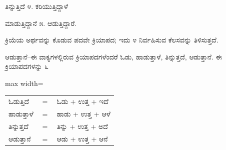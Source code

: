 \vspace{2.5pt plus 3pt minus 0.5pt}\noindent\hspace*{1.2em}\hspace{0.55em}ತಿನ್ನುತ್ತಿದೆ ೪. ಕರಿಯುತ್ತಿದ್ದಾಳೆ\par

\vspace{2.5pt plus 3pt minus 0.5pt}\noindent\hspace*{1.2em}\hspace{0.55em}ಮಾಡುತ್ತಿದ್ದಾನೆ ೫. ಆಡುತ್ತಿದ್ದಾರೆ.\par


\indent ಕ್ರಿಯೆಯ ಅರ್ಥವನ್ನು ಕೊಡುವ ಪದವೇ ಕ್ರಿಯಾಪದ; ಇದು ೪ ನಿರ್ವಹಿಸುವ ಕೆಲಸವನ್ನು ತಿಳಿಸುತ್ತದೆ.\par

\begin{kbvderiv}
\vspace{4pt plus 3pt minus 1pt}
\vspace{4pt plus 3pt minus 1pt}
\end{kbvderiv}

\indent ಆಡುತ್ತಾನೆ--ಈ ವಾಕ್ಯಗಳಲ್ಲಿರುವ ಕ್ರಿಯಾಪದಗಳೆಂದರೆ ಓಡು, ಹಾಡುತ್ತಾಳೆ, ತಿನ್ನುತ್ತದೆ, ಆಡುತ್ತಾನೆ. ಈ ಕ್ರಿಯಾಪದಗಳನ್ನು ೬\par

\begin{kbvderiv}
\vspace{4pt plus 3pt minus 1pt}
\begin{center}\begin{adjustbox}{max width=\textwidth}
{\renewcommand{\arraystretch}{1.22}\setlength{\tabcolsep}{4pt}
\begin{tabular}{l c l}
ಓಡುತ್ತಿದೆ & {\color{kbvgrey}$=$} & ಓಡು + ಉತ್ತ + ಇದೆ \\
ಹಾಡುತ್ತಾಳೆ & {\color{kbvgrey}$=$} & ಹಾಡು + ಉತ್ತ + ಆಳೆ \\
ತಿನ್ನುತ್ತದೆ & {\color{kbvgrey}$=$} & ತಿನ್ನು + ಉತ್ತ + ಅದೆ \\
ಆಡುತ್ತಾನೆ & {\color{kbvgrey}$=$} & ಆಡು + ಉತ್ತ + ಆನೆ \\
\end{tabular}}
\end{adjustbox}\end{center}
\vspace{4pt plus 3pt minus 1pt}
\end{kbvderiv}


